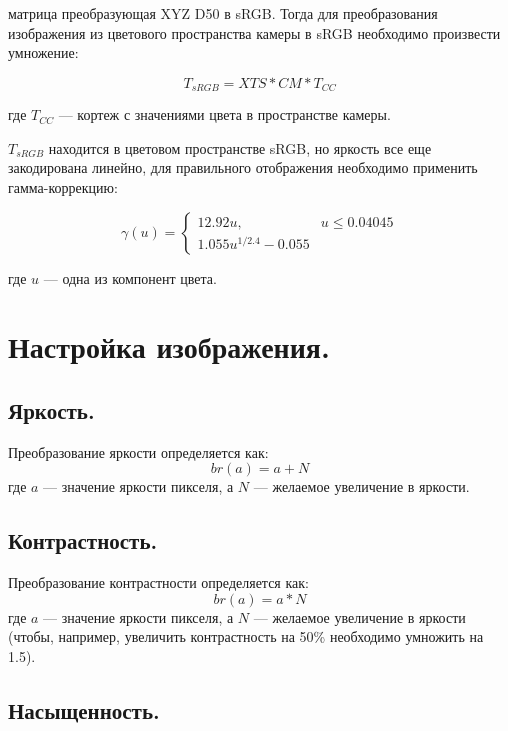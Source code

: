 матрица преобразующая XYZ D50 в sRGB. Тогда для преобразования изображения из цветового пространства камеры в sRGB необходимо произвести умножение:

\begin{equation}
	\label{tosrgb}
	T_{sRGB} = XTS * CM * T_{CC}
\end{equation}

где $T_{CC}$ --- кортеж с значениями цвета в пространстве камеры.

$T_{sRGB}$ находится в цветовом пространстве sRGB, но яркость все еще закодирована линейно, для правильного отображения необходимо применить гамма-коррекцию:

\begin{equation}
	\label{gamma}
	\gamma(u) = 
	\begin{cases}
		12.92u, & u \leq 0.04045 \\
		1.055u^{1/2.4} - 0.055
	\end{cases}
\end{equation}

где $u$ --- одна из компонент цвета.

\section{Настройка изображения.}

\subsection{Яркость.}

Преобразование яркости определяется как:
\begin{equation}
	\label{brightness}
	br(a) = a + N
\end{equation}
где $a$ --- значение яркости пикселя, а $N$ --- желаемое увеличение в яркости. \cite{brk}

\subsection{Контрастность.}

Преобразование контрастности определяется как:
\begin{equation}
	\label{contrast}
	br(a) = a * N
\end{equation}
где $a$ --- значение яркости пикселя, а $N$ --- желаемое увеличение в яркости (чтобы, например, увеличить контрастность на 50\% необходимо умножить на 1.5). \cite{brk}

\subsection{Насыщенность.}

